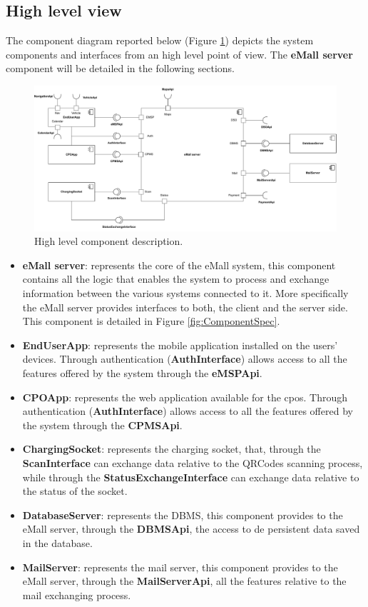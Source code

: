 \subsection{High level view}
The component diagram reported below (Figure \ref{fig:ComponentGen}) depicts the system components and interfaces from an high level point of view. The \textbf{eMall server} component will be detailed in the following sections.
\begin{figure}[H]
    \centering
    \includegraphics[width=\textwidth]{images/ComponentGenerico.pdf}
    \caption{High level component description.}
    \label{fig:ComponentGen}
\end{figure}
\begin{itemize}
    \item \textbf{eMall server}: represents the core of the eMall system, this component contains all the logic that enables the system to process and exchange information between the various systems connected to it. More specifically the eMall server provides interfaces to both, the client and the server side. This component is detailed in Figure \ref{fig:ComponentSpec}.
    \item \textbf{EndUserApp}: represents the mobile application installed on the users' devices. Through authentication (\textbf{AuthInterface}) allows access to all the features offered by the system through the \textbf{eMSPApi}.
    \item \textbf{CPOApp}: represents the web application available for the cpos. Through authentication (\textbf{AuthInterface}) allows access to all the features offered by the system through the \textbf{CPMSApi}.
    \item \textbf{ChargingSocket}: represents the charging socket, that, through the \textbf{ScanInterface} can exchange data relative to the QRCodes scanning process, while through the \textbf{StatusExchangeInterface} can exchange data relative to the status of the socket.
    \item \textbf{DatabaseServer}: represents the DBMS, this component provides to the eMall server, through the \textbf{DBMSApi}, the access to de persistent data saved in the database.
    \item \textbf{MailServer}: represents the mail server, this component provides to the eMall server, through the \textbf{MailServerApi}, all the features relative to the mail exchanging process.
\end{itemize}
